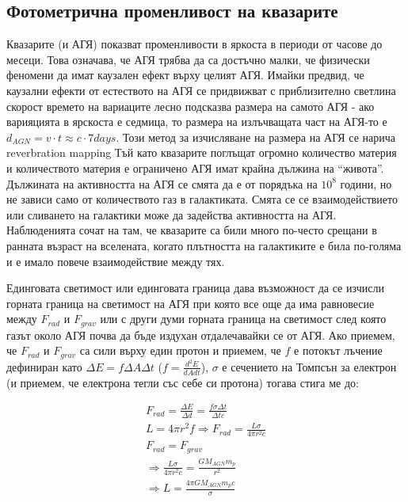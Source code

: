 \documentclass[a4paper,12pt]{article}
\begin{document}
\subsection{Фотометрична променливост на квазарите}
Квазарите (и АГЯ) показват променливости в яркоста в периоди от часове до месеци. Това означава, че АГЯ трябва да са достъчно малки, че физически феномени да имат каузален ефект върху целият АГЯ. Имайки предвид, че каузални ефекти от естеството на АГЯ се придвижват с приблизително светлина скорост времето на вариаците лесно подсказва размера на самото АГЯ - ако варияцията в ярскоста е седмица, то размера на излъчващата част на АГЯ-то е $d_{AGN}=v \cdot t \approx c \cdot 7days$. Този метод за изчисляване на размера на АГЯ се нарича reverbration mapping Тъй като квазарите поглъщат огромно количество материя и количеството материя е ограничено АГЯ имат крайна дължина на ``живота''. Дължината на активността на АГЯ се смята да е от порядъка на $10^8$ години, но не зависи само от количеството газ в галактиката. Смята се се взаимодействието или сливането на галактики може да задейства активността на АГЯ. Наблюденията сочат на там, че квазарите са били много по-често срещани в ранната възраст на вселената, когато плътността на галактиките е била по-голяма и е имало повече взаимодействие между тях.

Единговата светимост или единговата граница дава възможност да се изчисли горната граница на светимост на АГЯ при която все още да има равновесие между $F_{rad}$ и $F_{grav}$ или с други думи горната граница на светимост след която газът около АГЯ почва да бъде издухан отдалечавайки се от АГЯ. Ако приемем, че $F_{rad}$ и $F_{grav}$ са сили върху един протон и приемем, че $f$ е потокът лъчение дефиниран като $\Delta E = f \Delta A \Delta t$ ($f = \frac{d^2E}{dAdt}$), $\sigma$ е сечението на Томпсън за електрон (и приемем, че електрона тегли със себе си протона) тогава стига ме до:

\begin{gather}
    F_{rad} = \frac{\Delta E}{\Delta d} = \frac{f\sigma \Delta t}{\Delta t c}\\
    L=4\pi r^2 f \Rightarrow F_{rad}=\frac{L\sigma}{4\pi r^2 c}\\
    F_{rad} = F_{grav}\\
    \Rightarrow \frac{L\sigma}{4\pi r^2 c} = \frac{GM_{AGN} m_p}{r^2}\\
    \Rightarrow L = \frac{4\pi GM_{AGN} m_p c}{\sigma}
    \label{eq:Edington}
\end{gather}
\end{document}
